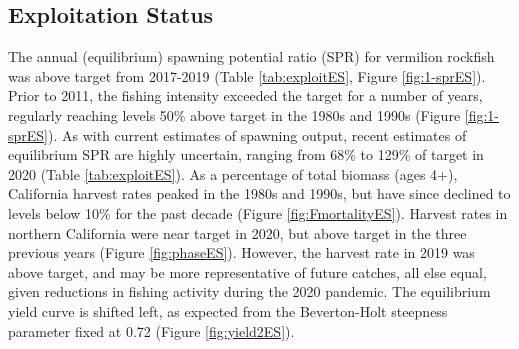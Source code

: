 \documentclass[11pt,
  english,
]{article}
\begin{document}
\FloatBarrier


\hypertarget{exploitation-status}{%
\subsection*{Exploitation Status}\label{exploitation-status}}

\leavevmode\tagmcend\tagstructend

The annual (equilibrium) spawning potential ratio (SPR) for vermilion rockfish was above target from 2017-2019 (Table \ref{tab:exploitES}, Figure \ref{fig:1-sprES}). Prior to 2011, the fishing intensity exceeded the target for a number of years, regularly reaching levels 50\% above target in the 1980s and 1990s (Figure \ref{fig:1-sprES}). As with current estimates of spawning output, recent estimates of equilibrium SPR are highly uncertain, ranging from 68\% to 129\% of target in 2020 (Table \ref{tab:exploitES}). As a percentage of total biomass (ages 4+), California harvest rates peaked in the 1980s and 1990s, but have since declined to levels below 10\% for the past decade (Figure \ref{fig:FmortalityES}). Harvest rates in northern California were near target in 2020, but above target in the three previous years (Figure \ref{fig:phaseES}). However, the harvest rate in 2019 was above target, and may be more representative of future catches, all else equal, given reductions in fishing activity during the 2020 pandemic. The equilibrium yield curve is shifted left, as expected from the Beverton-Holt steepness parameter fixed at 0.72 (Figure \ref{fig:yield2ES}).
\end{document}
